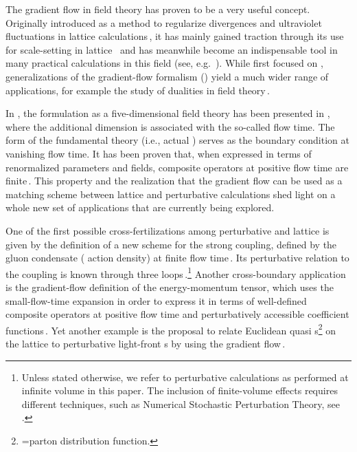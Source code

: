 
The gradient flow in field theory has proven to be a very useful
concept.  Originally introduced as a method to regularize divergences
and ultraviolet fluctuations in lattice
calculations\,\cite{Narayanan:2006rf,Luscher:2009eq}, it has mainly
gained traction through its use for scale-setting in lattice
\qcd{}\,\cite{Luscher:2010iy,Luscher:2013vga,Borsanyi:2012zs} and has
meanwhile become an indispensable tool in many practical calculations in
this field (see,
e.g.\ ).
While first focused on \qcd{}, generalizations of the gradient-flow
formalism (\gff) yield a much wider range of applications, for example
the study of dualities in field
theory\,\cite{Aoki:2015dla,Aoki:2016ohw,Aoki:2017uce,Aoki:2017bru,
  Aoki:2018dmc,Aoki:2019bfb}.

In \qcd{}, the formulation as a five-dimensional field theory has
been presented in , where the additional
dimension is associated with the so-called flow time. The form of the
fundamental theory (i.e., actual \qcd{}) serves as the boundary
condition at vanishing flow time. It has been proven that, when
expressed in terms of renormalized parameters and fields, composite
operators at positive flow time are finite\,\cite{Luscher:2011bx}. This
property and the realization that the gradient flow can be used as a
matching scheme between lattice and perturbative calculations shed light
on a whole new set of applications that are currently being explored.

One of the first possible cross-fertilizations among perturbative and
lattice \qcd{} is given by the definition of a new scheme for the strong
coupling, defined by the gluon condensate (\qcd{} action density) at
finite flow time\,\cite{Luscher:2010iy}.  Its perturbative relation to
the \msbar{} coupling is known through three
loops\,\cite{Harlander:2016vzb}.\footnote{Unless stated otherwise, we
  refer to perturbative calculations as performed at infinite volume in
  this paper. The inclusion of finite-volume effects requires different
  techniques, such as Numerical Stochastic Perturbation Theory, see
  .}  Another cross-boundary application is
the gradient-flow definition of the energy-momentum tensor, which uses
the small-flow-time expansion in order to express it in terms of
well-defined composite operators at positive flow time and
perturbatively accessible coefficient
functions\,\cite{Suzuki:2013gza,Makino:2014taa,
  Harlander:2018zpi,Iritani:2018idk}. Yet another example is the
proposal to relate Euclidean quasi \pdf{}s\footnote{\pdf=parton
  distribution function.} on the lattice to perturbative light-front
\pdf{}s by using the gradient
flow\,\cite{Monahan:2016bvm,Monahan:2017hpu}.

